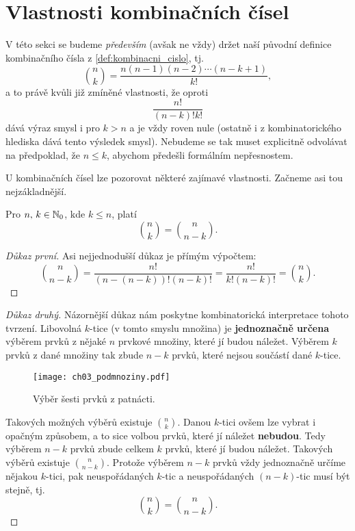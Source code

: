 \section{Vlastnosti kombinačních čísel}

V této sekci se budeme \emph{především} (avšak ne vždy) držet naší původní definice kombinačního čísla z \ref{def:kombinacni_cislo}, tj.
\[\binom{n}{k}=\dfrac{n(n-1)(n-2)\cdots(n-k+1)}{k!},\]
a to právě kvůli již zmíněné vlastnosti, že oproti
\[\dfrac{n!}{(n-k)!k!}\]
dává výraz smysl i pro $k>n$ a je vždy roven nule (ostatně i z kombinatorického hlediska dává tento výsledek smysl). Nebudeme se tak muset explicitně odvolávat na předpoklad, že $n\leqslant k$, abychom předešli formálním nepřesnostem.
\medskip

U kombinačních čísel lze pozorovat některé zajímavé vlastnosti. Začneme asi tou nejzákladnější.
\begin{theorem}
    Pro $n,\,k\in\mathbb{N}_0$, kde $k\leqslant n$, platí
    \[\binom{n}{k}=\binom{n}{n-k}.\]
\end{theorem}
\begin{proof}[Důkaz první]
    Asi nejjednodušší důkaz je přímým výpočtem:
    \[\binom{n}{n-k}=\dfrac{n!}{(n-(n-k))!(n-k)!}=\dfrac{n!}{k!(n-k)!}=\binom{n}{k}.\]
\end{proof}
\begin{proof}[Důkaz druhý]
    Názornější důkaz nám poskytne kombinatorická interpretace tohoto tvrzení. Libovolná $k$-tice (v tomto smyslu množina) je \textbf{jednoznačně určena} výběrem prvků z nějaké $n$ prvkové množiny, které jí budou náležet. Výběrem $k$ prvků z dané množiny tak zbude $n-k$ prvků, které nejsou součástí dané $k$-tice.
    \begin{figure}[H]
        \centering
        \texttt{[image: ch03\_podmnoziny.pdf]}
        \caption{Výběr šesti prvků z patnácti.}
        \label{fig:podmnoziny}
    \end{figure}
    Takových možných výběrů existuje $\binom{n}{k}$. Danou $k$-tici ovšem lze vybrat i opačným způsobem, a to sice volbou prvků, které jí náležet \textbf{nebudou}. Tedy výběrem $n-k$ prvků zbude celkem $k$ prvků, které jí budou náležet. Takových výběrů existuje $\binom{n}{n-k}$. Protože výběrem $n-k$ prvků vždy jednoznačně určíme nějakou $k$-tici, pak neuspořádaných $k$-tic a neuspořádaných $(n-k)$-tic musí být stejně, tj.
    \[\binom{n}{k}=\binom{n}{n-k}.\]
\end{proof}

